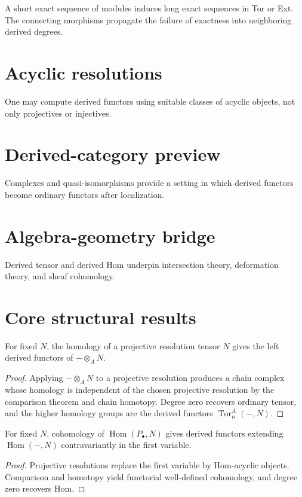 \begin{example}\label{ex:v28-expand-03}
A short exact sequence of modules induces long exact sequences in Tor or Ext. The connecting morphisms propagate the failure of exactness into neighboring derived degrees.
\end{example}
\section{Acyclic resolutions}
One may compute derived functors using suitable classes of acyclic objects, not only projectives or injectives.

\section{Derived-category preview}
Complexes and quasi-isomorphisms provide a setting in which derived functors become ordinary functors after localization.

\section{Algebra-geometry bridge}
Derived tensor and derived Hom underpin intersection theory, deformation theory, and sheaf cohomology.

\section{Core structural results}

\begin{theorem}\label{thm:v28-01}
For fixed $N$, the homology of a projective resolution tensor $N$ gives the left derived functors of $-\otimes_A N$.
\begin{proof}
Applying \(-\otimes_A N\) to a projective resolution produces a chain complex whose homology is independent of the chosen projective resolution by the comparison theorem and chain homotopy. Degree zero recovers ordinary tensor, and the higher homology groups are the derived functors \(\operatorname{Tor}_n^A(-,N)\).
\end{proof}
\end{theorem}

\begin{theorem}\label{thm:v28-02}
For fixed $N$, cohomology of $\operatorname{Hom}(P_\bullet,N)$ gives derived functors extending $\operatorname{Hom}(-,N)$ contravariantly in the first variable.
\begin{proof}
Projective resolutions replace the first variable by Hom-acyclic objects. Comparison and homotopy yield functorial well-defined cohomology, and degree zero recovers Hom.
\end{proof}
\end{theorem}

